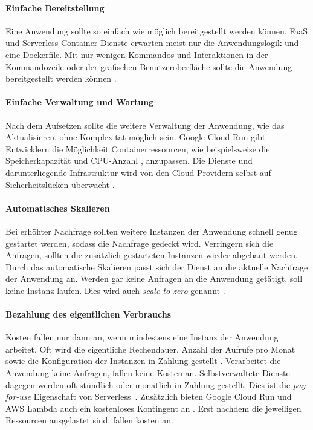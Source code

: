 \paragraph{Einfache Bereitstellung} Eine Anwendung sollte so einfach
wie möglich bereitgestellt werden können.
FaaS und Serverless Container Dienste erwarten meist nur die
Anwendungslogik und eine Dockerfile.
Mit nur wenigen Kommandos und Interaktionen in der Kommandozeile oder
der grafischen Benutzeroberfläche sollte die Anwendung
bereitgestellt werden können \cite{ServerlessTrends}.

\paragraph{Einfache Verwaltung und Wartung} 
Nach dem Aufsetzen sollte die weitere Verwaltung der Anwendung, wie das Aktualisieren,
ohne Komplexität möglich sein. Google Cloud Run gibt Entwicklern die Möglichkeit
Containerressourcen, wie beispielsweise die Speicherkapazität \cite{CloudRunMemLimits}
und CPU-Anzahl \cite{CloudRunCpuAlloc}, anzupassen. Die Dienste und darunterliegende
Infrastruktur wird von den Cloud-Providern selbst auf Sicherheitslücken überwacht \cite{ServerlessTrends}.

\paragraph{Automatisches Skalieren} Bei erhöhter Nachfrage sollten weitere Instanzen der Anwendung
schnell genug gestartet werden, sodass die Nachfrage gedeckt wird.
Verringern sich die Anfragen, sollten die zusätzlich gestarteten Instanzen wieder abgebaut werden.
Durch das automatische Skalieren passt sich der Dienst an die aktuelle Nachfrage der Anwendung an.
Werden gar keine Anfragen an die Anwendung getätigt, soll keine Instanz laufen.
Dies wird auch \emph{scale-to-zero} genannt \cite{ServerlessTrends}.

\paragraph{Bezahlung des eigentlichen Verbrauchs} Kosten fallen nur dann an, wenn mindestens eine
Instanz der Anwendung arbeitet. Oft wird die eigentliche Rechendauer, Anzahl der
Aufrufe pro Monat sowie die Konfiguration der Instanzen in Zahlung gestellt \cite{ServerlessTrends}.
Verarbeitet die Anwendung keine Anfragen, fallen keine Kosten an.
Selbstverwaltete Dienste dagegen werden oft stündlich oder monatlich in Zahlung gestellt.
Dies ist die \emph{pay-for-use} Eigenschaft von Serverless \cite{Firecracker}.
Zusätzlich bieten Google Cloud Run und AWS Lambda auch ein kostenloses Kontingent an
\cite{CloudRunPricing} \cite{AWSLambda}. Erst nachdem die jeweiligen Ressourcen
ausgelastet sind, fallen kosten an.

